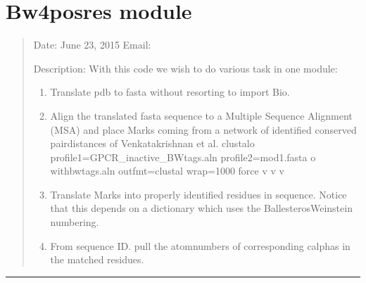 \documentclass[letterpaper,10pt,english]{sphinxmanual}
\begin{document}
\section{Bw4posres module}
\label{\detokenize{bw4posres:module-bw4posres}}\label{\detokenize{bw4posres:bw4posres-module}}\label{\detokenize{bw4posres::doc}}\begin{quote}

\sphinxAtStartPar
Date:        June 23, 2015
Email:       

\sphinxAtStartPar
Description:
With this code we wish to do various task in one module:
\begin{enumerate}
%
\item {} 
\sphinxAtStartPar
Translate pdb to fasta without resorting to import Bio.

\item {} 
\sphinxAtStartPar
Align the translated fasta sequence to a Multiple Sequence Alignment (MSA)
and place Marks coming from a network of identified conserved
pair\sphinxhyphen{}distances of Venkatakrishnan et al.
clustalo \textendash{}profile1=GPCR\_inactive\_BWtags.aln \textendash{}profile2=mod1.fasta     \sphinxhyphen{}o withbwtags.aln \textendash{}outfmt=clustal \textendash{}wrap=1000 \textendash{}force \sphinxhyphen{}v \sphinxhyphen{}v \sphinxhyphen{}v

\item {} 
\sphinxAtStartPar
Translate Marks into properly identified residues in sequence. Notice that
this depends on a dictionary which uses the Ballesteros\sphinxhyphen{}Weinstein numbering.

\item {} 
\sphinxAtStartPar
From sequence ID. pull the atom\sphinxhyphen{}numbers of corresponding c\sphinxhyphen{}alphas
in the matched residues.

\end{enumerate}
\end{quote}


\bigskip\hrule\bigskip

\end{document}
